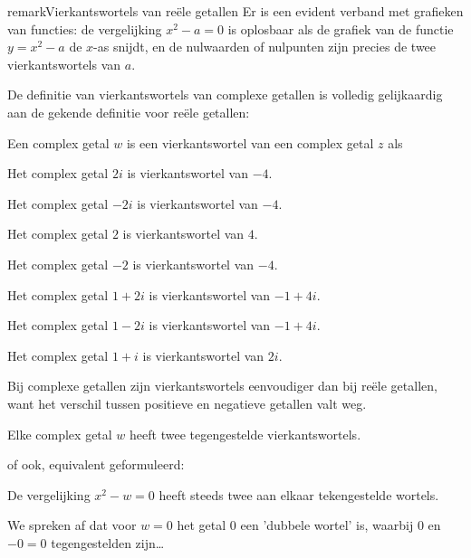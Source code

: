 \documentclass{ximera}
\begin{document}
\begin{expandable}{remark}{Vierkantswortels van reële getallen}
        Er is een evident verband met grafieken van functies: de vergelijking $x^2-a=0$ is oplosbaar als de grafiek van de functie $y=x^2-a$ de $x$-as snijdt, en de nulwaarden of nulpunten zijn precies de twee vierkantswortels van $a$.

    \end{expandable}


    De definitie van vierkantswortels van complexe getallen is volledig gelijkaardig aan de gekende definitie voor reële getallen:
    \begin{definition}\nl

        Een complex getal $w$ is een {vierkantswortel} van een complex getal $z$ als 
    \end{definition}

    \begin{example}
        \begin{question} Het complex getal $2i$ is \choiceEen vierkantswortel van $-4$. \end{question}
        \begin{question} Het complex getal $-2i$ is \choiceEen vierkantswortel van $-4$. \end{question}
        \begin{question} Het complex getal $2$ is \choiceGeen vierkantswortel van $4$. \end{question}
        \begin{question} Het complex getal $-2$ is \choiceGeen vierkantswortel van $-4$. \end{question}
        \begin{question} Het complex getal $1+2i$ is \choiceEen vierkantswortel van $-1+4i$. \end{question}
        \begin{question} Het complex getal $1-2i$ is \choiceGeen vierkantswortel van $-1+4i$. \end{question}
        \begin{question} Het complex getal $1+i$ is \choiceEen vierkantswortel van $2i$. \end{question}
    \end{example}

    Bij complexe getallen zijn vierkantswortels eenvoudiger dan bij reële getallen, want het verschil tussen positieve en negatieve getallen valt weg.

    \begin{proposition}
        Elke complex getal $w$ heeft twee tegengestelde vierkantswortels.

        of ook, equivalent geformuleerd:
        {\centering

        De vergelijking $x^2-w = 0$ heeft steeds twee aan elkaar tekengestelde wortels.
        }
    \end{proposition}
    We spreken af dat voor $w=0$ het getal $0$ een 'dubbele wortel' is, waarbij $0$ en $-0=0$ tegengestelden zijn\ldots
\end{document}
